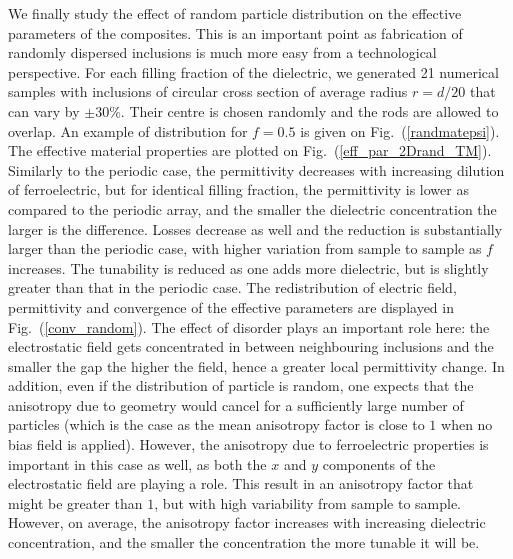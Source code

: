 \documentclass[openacc]{rsproca_new}%
\newcommand{\fig}[1]{Fig.~(\ref{#1})}
\begin{document}
We finally study the effect of random particle distribution on the effective parameters of the
composites. This is an important point as fabrication of randomly dispersed
inclusions is much more easy from a technological perspective. For each filling fraction of the dielectric,
we generated 21 numerical samples with inclusions of circular cross section of average radius
$r=d/20$ that can vary by $\pm 30\%$. Their centre is chosen randomly and the
rods are allowed to overlap. An example of distribution for $f=0.5$ is given on \fig{randmatepsi}.
The effective material properties are plotted on \fig{eff_par_2Drand_TM}.
Similarly to the periodic case, the permittivity decreases with increasing dilution of
ferroelectric, but for identical filling fraction,
the permittivity is lower as compared to the periodic array, and the smaller the dielectric concentration the larger
is the difference. Losses decrease as well and the reduction is substantially larger
than the periodic case, with higher variation from sample to sample as $f$ increases.
The tunability is reduced as one adds more dielectric, but is slightly greater than that in the periodic case.
The redistribution of electric field, permittivity and convergence of
the effective parameters are displayed in \fig{conv_random}. The effect of
disorder plays an important role here: the electrostatic field gets concentrated
in between neighbouring inclusions and the smaller the gap the higher the field, hence
a greater local permittivity change. In addition, even if the distribution of particle is
random, one expects that the anisotropy due to geometry would cancel for a sufficiently large number
of particles (which is the case as the mean anisotropy factor is close to $1$ when no
bias field is applied). However, the anisotropy due to ferroelectric properties is
important in this case as well, as both the $x$ and $y$ components of the electrostatic field
are playing a role. This result in an anisotropy factor that might be greater than $1$,
but with high variability from sample to sample. However, on average, the anisotropy factor
increases with increasing dielectric concentration, and the smaller the concentration the more tunable
it will be.
\end{document}
